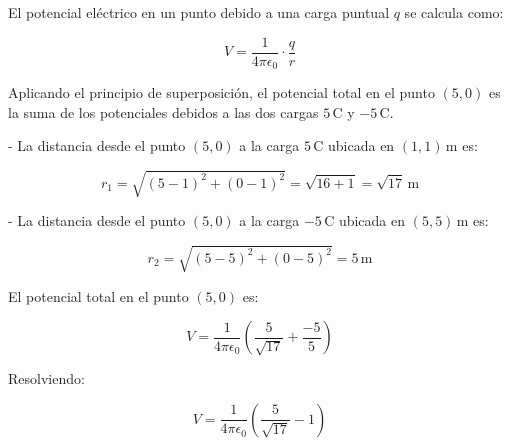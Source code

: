 \documentclass[12pt, answers]{exam} %
\begin{document}
\begin{questions}
   
        El potencial eléctrico en un punto debido a una carga puntual \( q \) se calcula como:
        
        \[
        V = \frac{1}{4 \pi \epsilon_0} \cdot \frac{q}{r}
        \]
        
        Aplicando el principio de superposición, el potencial total en el punto \( (5,0) \) es la suma de los potenciales debidos a las dos cargas \( 5 \, \text{C} \) y \( -5 \, \text{C} \).
        
        - La distancia desde el punto \( (5,0) \) a la carga \( 5 \, \text{C} \) ubicada en \( (1,1) \, \text{m} \) es:
        
        \[
        r_1 = \sqrt{(5-1)^2 + (0-1)^2} = \sqrt{16 + 1} = \sqrt{17} \, \text{m}
        \]
        
        - La distancia desde el punto \( (5,0) \) a la carga \( -5 \, \text{C} \) ubicada en \( (5,5) \, \text{m} \) es:
        
        \[
        r_2 = \sqrt{(5-5)^2 + (0-5)^2} = 5 \, \text{m}
        \]
        
        El potencial total en el punto \( (5,0) \) es:
        
        \[
        V = \frac{1}{4 \pi \epsilon_0} \left( \frac{5}{\sqrt{17}} + \frac{-5}{5} \right)
        \]
        
        Resolviendo:
        
        \[
        V = \frac{1}{4 \pi \epsilon_0} \left( \frac{5}{\sqrt{17}} - 1 \right)
        \]
        
        
        
        


\end{questions}
\end{document}
